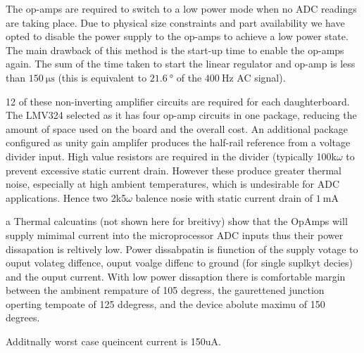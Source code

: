 The op-amps are required to switch to a low power mode when no ADC readings are taking place.
Due to physical size constraints and part availability we have opted to disable the power supply to the op-amps to achieve a low power state.
The main drawback of this method is the start-up time to enable the op-amps again.
The sum of the time taken to start the linear regulator and op-amp is less than $\SI{150}{\micro\second}$ (this is equivalent to $\SI{21.6}{\degree}$ of the $\SI{400}{\hertz}$ AC signal).

12 of these non-inverting amplifier circuits are required for each daughterboard.
The LMV324 selected as it has four op-amp circuits in one package, reducing the amount of space used on the board and the overall cost.
An additional package configured as unity gain amplifer produces the half-rail reference from a voltage divider input.
High value resistors are required in the divider (typically 100k$\omega$ to prevent excessive static current drain.
However these produce greater thermal noise, especially at high ambient temperatures, which is undesirable for ADC applications. Hence two 2k5$\omega$ balence nosie with 
static current drain of $\SI{1}{\milli\ampere}$

a 
Thermal calcuatins (not shown here for breitivy) show that the OpAmps will supply mimimal current into the microprocessor ADC inputs thus their power dissapation is reltively low.
Power dissabpatin is fiunction of the supply votage to ouput volateg diffence, ouput voalge diffenc to ground (for single suplkyt decies) and the ouput current.
With low power dissaption there is comfortable margin between the ambinent rempature of 105 degress, the gaurettened junction operting tempoate of 125 ddegress, and the device abolute maximu of 150 degrees.

Additnally worst case queincent current is 150uA.